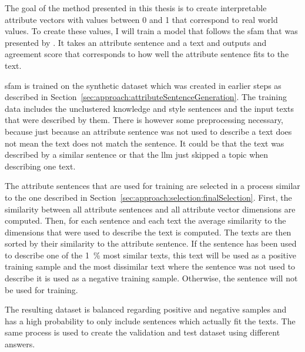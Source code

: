 The goal of the method presented in this thesis is to create interpretable attribute vectors with values between \num{0} and \num{1} that correspond to real world values. To create these values, I will train a model that follows the \acf{sfam} that was presented by \citet{patelLearningInterpretableStyle2023}. It takes an attribute sentence and a text and outputs and agreement score that corresponds to how well the attribute sentence fits to the text.

\ac{sfam} is trained on the synthetic dataset which was created in earlier steps as described in Section~\ref{sec:approach:attributeSentenceGeneration}. The training data includes the unclustered knowledge and style sentences and the input texts that were described by them. There is however some preprocessing necessary, because just because an attribute sentence was not used to describe a text does not mean the text does not match the sentence. It could be that the text was described by a similar sentence or that the \ac{llm} just skipped a topic when describing one text.

The attribute sentences that are used for training are selected in a process similar to the one described in Section~\ref{sec:approach:selection:finalSelection}.
First, the similarity between all attribute sentences and all attribute vector dimensions are computed. Then, for each sentence and each text the average similarity to the dimensions that were used to describe the text is computed. The texts are then sorted by their similarity to the attribute sentence. If the sentence has been used to describe one of the \SI{1}{\percent} most similar texts, this text will be used as a positive training sample and the most dissimilar text where the sentence was not used to describe it is used as a negative training sample. Otherwise, the sentence will not be used for training.

The resulting dataset is balanced regarding positive and negative samples and has a high probability to only include sentences which actually fit the texts. %
The same process is used to create the validation and test dataset using different answers. %

